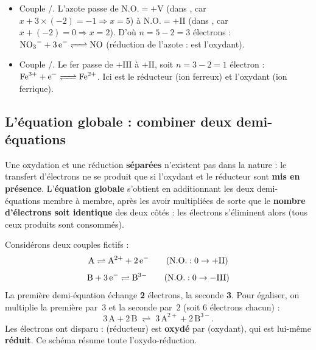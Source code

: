 \documentclass[11pt,a4paper]{article}
\newcommand{\NO}{\ensuremath{\mathrm{N.O.}}}    %
\begin{document}
\begin{exemple}
\begin{itemize}[leftmargin=1.6em,topsep=1pt,itemsep=4pt]
  \item Couple /. L'azote passe de $\NO=+\mathrm{V}$ (dans ,
        car $x+3\times(-2)=-1\Rightarrow x=5$) à $\NO=+\mathrm{II}$ (dans ,
        car $x+(-2)=0\Rightarrow x=2$). D'où $n=5-2=3$ électrons :
        $\ce{NO3^- + 3 e^- <=> NO}$ (réduction de l'azote :  est l'oxydant).
  \item Couple /. Le fer passe de $+\mathrm{III}$ à $+\mathrm{II}$, soit
        $n=3-2=1$ électron : $\ce{Fe^{3+} + e^- <=> Fe^{2+}}$. Ici  est le réducteur
        (ion ferreux) et  l'oxydant (ion ferrique).
\end{itemize}
\end{exemple}

\subsection{L'équation globale : combiner deux demi-équations}

Une oxydation et une réduction \textbf{séparées} n'existent pas dans la nature : le transfert
d'électrons ne se produit que si l'oxydant et le réducteur sont \textbf{mis en présence}.
L'\textbf{équation globale} s'obtient en additionnant les deux demi-équations membre à membre,
après les avoir multipliées de sorte que le \textbf{nombre d'électrons soit identique} des deux
côtés : les électrons s'éliminent alors (tous ceux produits sont consommés).

\begin{exemple}
Considérons deux couples fictifs :
\[
\mathrm{A}\rightleftharpoons\mathrm{A}^{2+}+2\,\ce{e^-}\qquad(\NO:0\to +\mathrm{II})
\]
\[
\mathrm{B}+3\,\ce{e^-}\rightleftharpoons\mathrm{B}^{3-}\qquad(\NO:0\to -\mathrm{III})
\]
La première demi-équation échange \textbf{2} électrons, la seconde \textbf{3}. Pour égaliser, on
multiplie la première par~$3$ et la seconde par~$2$ (soit $6$ électrons chacun) :
\[
3\,\mathrm{A}+2\,\mathrm{B}\;\rightleftharpoons\;3\,\mathrm{A}^{2+}+2\,\mathrm{B}^{3-}.
\]
Les électrons ont disparu :  (réducteur) est \textbf{oxydé} par  (oxydant), qui est
lui-même \textbf{réduit}. Ce schéma résume toute l'oxydo-réduction.
\end{exemple}

\end{document}
